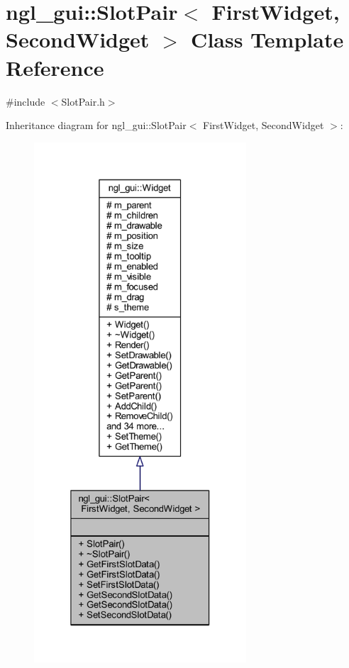 \hypertarget{classngl__gui_1_1_slot_pair}{}\section{ngl\+\_\+gui\+:\+:Slot\+Pair$<$ First\+Widget, Second\+Widget $>$ Class Template Reference}
\label{classngl__gui_1_1_slot_pair}


{\ttfamily \#include $<$Slot\+Pair.\+h$>$}



Inheritance diagram for ngl\+\_\+gui\+:\+:Slot\+Pair$<$ First\+Widget, Second\+Widget $>$\+:\nopagebreak
\begin{figure}[H]
\begin{center}
\leavevmode
\includegraphics[height=550pt]{classngl__gui_1_1_slot_pair__inherit__graph}
\end{center}
\end{figure}


